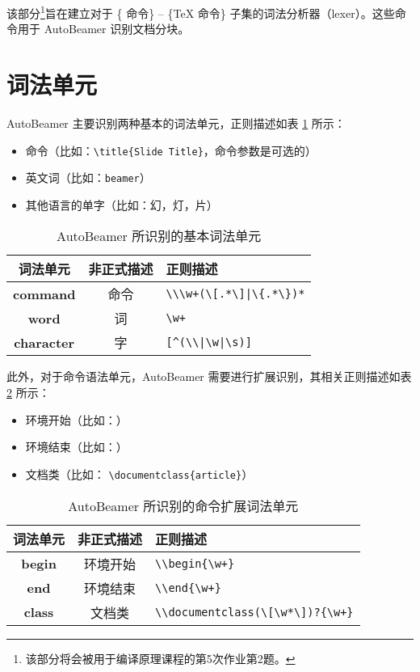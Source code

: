 
该部分\footnote{该部分将会被用于编译原理课程的第5次作业第2题。}旨在建立对于 \{\LaTeXe{} 命令\} -- \{\TeX{} 命令\} 子集的词法分析器（lexer）。这些命令用于 \textsf{AutoBeamer} 识别文档分块。

\section{词法单元}

\textsf{AutoBeamer} 主要识别两种基本的词法单元，正则描述如表 \ref{tab:basic-unit} 所示：
\begin{itemize}
    \item 命令（比如：\verb"\title{Slide Title}"，命令参数是可选的）
    \item 英文词（比如：\verb"beamer"）
    \item 其他语言的单字（比如：幻，灯，片）
\end{itemize}

\begin{table}[h]
    \centering
    \caption{\textsf{AutoBeamer} 所识别的基本词法单元}
    \label{tab:basic-unit}
    \begin{tabular}{>{\bfseries}c|cl}
        \toprule
        词法单元 & 非正式描述 & 正则描述\\
        \midrule
        command & 命令  & \verb"\\\w+(\[.*\]|\{.*\})*" \\
        word   & 词  & \verb"\w+" \\
        character & 字 & \verb"[^(\\|\w|\s)]" \\
        \bottomrule
    \end{tabular}
\end{table}

此外，对于命令语法单元，\textsf{AutoBeamer} 需要进行扩展识别，其相关正则描述如表 \ref{tab:extend-unit} 所示：
\begin{itemize}
    \item 环境开始（比如：\verb""）
    \item 环境结束（比如：\verb""）
    \item 文档类（比如： \verb"\documentclass{article}"）
\end{itemize}

\begin{table}[h]
    \centering
    \caption{\textsf{AutoBeamer} 所识别的命令扩展词法单元}
    \label{tab:extend-unit}
    \begin{tabular}{>{\bfseries}c|cl}
        \toprule
        词法单元 & 非正式描述 & 正则描述\\
        \midrule
        begin   & 环境开始  & \verb"\\begin{\w+}" \\
        end     & 环境结束  & \verb"\\end{\w+}" \\
        class   & 文档类    & \verb"\\documentclass(\[\w*\])?{\w+}" \\
        \bottomrule
    \end{tabular}
\end{table}

